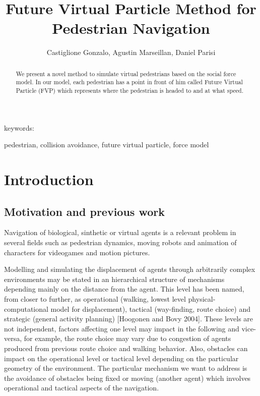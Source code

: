 \documentclass[english]{article}
\numberwithin{equation}{section}
\numberwithin{figure}{section}
\begin{document}
\title{Future Virtual Particle Method for Pedestrian Navigation}


\author{Castiglione Gonzalo, Agustin Marseillan, Daniel Parisi}
\maketitle
\begin{abstract}
We present a novel method to simulate virtual pedestrians based on
the social force model. In our model, each pedestrian has a point
in front of him called Future Virtual Particle (FVP) which represents
where the pedestrian is headed to and at what speed.
\end{abstract}
keywords:

pedestrian, collision avoidance, future virtual particle, force model

\pagebreak{}


\section{Introduction}


\subsection{Motivation and previous work}

Navigation of biological, sinthetic or virtual agents is a relevant
problem in several fields such as pedestrian dynamics, moving robots
and animation of characters for videogames and motion pictures.

Modelling and simulating the displacement of agents through arbitrarily
complex environments may be stated in an hierarchical structure of mechanisms
depending mainly on the distance from the agent. This level has been
named, from closer to further, as operational (walking, lowest level
physical-computational model for displacement), tactical (way-finding,
route choice) and strategic (general activity planning) {[}Hoogonen
and Bovy 2004{]}. These levels are not independent, factors affecting
one level may impact in the following and vice-versa, for example,
the route choice may vary due to congestion of agents produced from
previous route choice and walking behavior. Also, obstacles can impact
on the operational level or tactical level depending on the particular
geometry of the environment. The particular mechanism we want to address
is the avoidance of obstacles being fixed or moving (another agent)
which involves operational and tactical aspects of the navigation.
\end{document}
